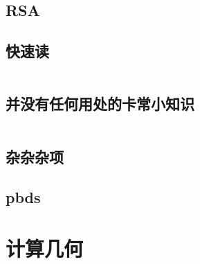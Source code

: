 \documentclass[a4paper,11pt]{article}
\begin{document}
\subsection{RSA}


\subsection{快速读}
\inputminted[breaklines]{c++}{Others/quick_IO.cpp}

\subsection{并没有任何用处的卡常小知识}
\inputminted[breaklines]{c++}{Others/并没有任何用处的卡常小知识.cpp}

\subsection{杂杂杂项}


\subsection{pbds}






\newpage
\section{计算几何}







\end{document}

